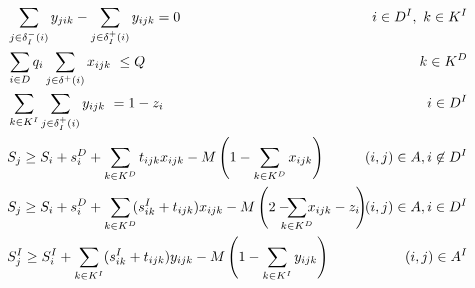\documentclass{article}
\begin{document}
{\begin{align}
\label{c5} & \hspace{-10mm}  \sum_{j \in \delta^{-}_I(i)}y_{jik} - \sum_{j \in \delta^{+}_I(i)}y_{ijk} = 0 & \hspace{-40mm}  i \in D^I ,\ k \in K^{I} \hspace{0mm}  \\
\label{c6} & \hspace{-10mm}  \sum_{i \in D}q_{i} \sum_{j \in \delta^{+}(i)}x_{ijk}\ \leq Q & \hspace{-40mm}k \in K^{D} \hspace{0mm}  \\
\label{c7} & \hspace{-10mm}  \sum_{k \in K^{I}}\sum_{j \in \delta^{+}_I(i)}y_{ijk}\ = 1 - z_{i} & \hspace{-40mm}  i \in D^I \hspace{0mm} \\
\label{c8} &\hspace{-10mm}  S_j \geq \hspace{-0mm} S_i +  s_i^D + \sum_{k \in K^{D}} t_{ijk} x_{ijk} - M\left(1-\sum_{k \in K^{D}} x_{ijk}\right) & \hspace{-15mm}  (i,j) \in A, i \not\in D^I \hspace{0mm} \\
\label{c9} & \hspace{-10mm}  S_j \hspace{-0mm} \geq \hspace{-0mm} S_i \hspace{-0mm}+ s^D_i \hspace{-0mm}+ \hspace{-0mm}\sum_{k \in K^{D}}\hspace{-1mm}(s_{ik}^I + t_{ijk} )x_{ijk} \hspace{-0mm}- \hspace{-0mm}M\hspace{-0mm}\left(\hspace{-0mm}2-\hspace{-3mm}\sum_{k \in K^{D}} \hspace{-2mm}x_{ijk}-z_{i}\hspace{-1mm}\right)  &  \hspace{-4mm}(i,j) \in A, i \in D^I \hspace{0mm}  \\
\label{c10} & \hspace{-10mm} S^I_j \geq \hspace{-0mm} S^I_i +  \sum_{k \in K^{I}}(s_{ik}^I + t_{ijk} )y_{ijk} - M\left(1-\sum_{k \in K^{I}} y_{ijk}\right)  & \hspace{-40mm}  (i,j) \in A^I \hspace{0mm} \\

\end{align}}
\end{document}
